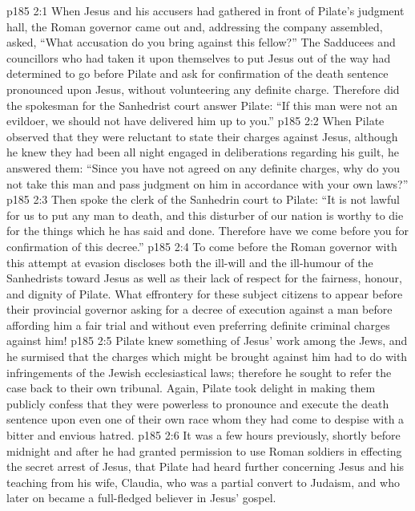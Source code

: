 \vs p185 2:1 When Jesus and his accusers had gathered in front of Pilate’s judgment hall, the Roman governor came out and, addressing the company assembled, asked, “What accusation do you bring against this fellow?” The Sadducees and councillors who had taken it upon themselves to put Jesus out of the way had determined to go before Pilate and ask for confirmation of the death sentence pronounced upon Jesus, without volunteering any definite charge. Therefore did the spokesman for the Sanhedrist court answer Pilate: “If this man were not an evildoer, we should not have delivered him up to you.”
\vs p185 2:2 When Pilate observed that they were reluctant to state their charges against Jesus, although he knew they had been all night engaged in deliberations regarding his guilt, he answered them: “Since you have not agreed on any definite charges, why do you not take this man and pass judgment on him in accordance with your own laws?”
\vs p185 2:3 Then spoke the clerk of the Sanhedrin court to Pilate: “It is not lawful for us to put any man to death, and this disturber of our nation is worthy to die for the things which he has said and done. Therefore have we come before you for confirmation of this decree.”
\vs p185 2:4 To come before the Roman governor with this attempt at evasion discloses both the ill\hyp{}will and the ill\hyp{}humour of the Sanhedrists toward Jesus as well as their lack of respect for the fairness, honour, and dignity of Pilate. What effrontery for these subject citizens to appear before their provincial governor asking for a decree of execution against a man before affording him a fair trial and without even preferring definite criminal charges against him!
\vs p185 2:5 Pilate knew something of Jesus’ work among the Jews, and he surmised that the charges which might be brought against him had to do with infringements of the Jewish ecclesiastical laws; therefore he sought to refer the case back to their own tribunal. Again, Pilate took delight in making them publicly confess that they were powerless to pronounce and execute the death sentence upon even one of their own race whom they had come to despise with a bitter and envious hatred.
\vs p185 2:6 \pc It was a few hours previously, shortly before midnight and after he had granted permission to use Roman soldiers in effecting the secret arrest of Jesus, that Pilate had heard further concerning Jesus and his teaching from his wife, Claudia, who was a partial convert to Judaism, and who later on became a full\hyp{}fledged believer in Jesus’ gospel.
